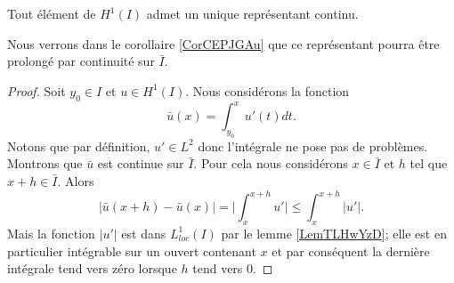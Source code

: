 \begin{lemma}   \label{LemMPkbZxX}
    Tout élément de \( H^1(I)\) admet un unique représentant continu.
\end{lemma}
Nous verrons dans le corollaire \ref{CorCEPJGAu} que ce représentant pourra être prolongé par continuité sur \( \bar I\).

\begin{proof}
    Soit \( y_0\in I\) et \( u\in H^1(I)\). Nous considérons la fonction
    \begin{equation}
        \bar u(x)=\int_{y_0}^xu'(t)dt.
    \end{equation}
    Notons que par définition, \( u'\in L^2\) donc l'intégrale ne pose pas de problèmes. Montrons que \( \bar u\) est continue sur \( \bar I\). Pour cela nous considérons \( x\in\bar I\) et \( h\) tel que \( x+h\in \bar I\). Alors
    \begin{equation}
        \big| \bar u(x+h)-\bar u(x) \big|=\big| \int_x^{x+h}u' \big|\leq \int_x^{x+h}| u' |.
    \end{equation}
    Mais la fonction \( | u' |\) est dans \( L^1_{loc}(I)\) par le lemme \ref{LemTLHwYzD}; elle est en particulier intégrable sur un ouvert contenant \( x\) et par conséquent la dernière intégrale tend vers zéro lorsque \( h\) tend vers \( 0\).


\end{proof}
